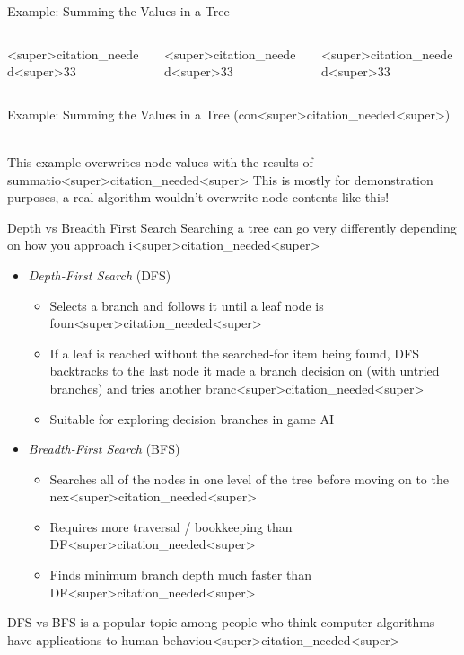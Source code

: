 \documentclass[11pt]{beamer}
\begin{document}
\begin{frame}{Example: Summing the Values in a Tree}
\begin{columns}
\begin{column}{<super>citation_needed<super>33\textwidth}
\center
\
\
\end{column}
\begin{column}{<super>citation_needed<super>33\textwidth}
\center
\
\
\end{column}
\begin{column}{<super>citation_needed<super>33\textwidth}
\center
\
\
\end{column}
\end{columns}
\end{frame}

\begin{frame}{Example: Summing the Values in a Tree (con<super>citation_needed<super>)}
\center
\
\
\
\

This example overwrites node values with the results of summatio<super>citation_needed<super>  This is mostly for demonstration purposes, a real algorithm wouldn't overwrite node contents like this! 
\end{frame}

\begin{frame}{Depth vs Breadth First Search}
Searching a tree can go very differently depending on how you approach i<super>citation_needed<super>
\begin{itemize}
\item \textit{Depth-First Search} (DFS)
\begin{itemize}
\item Selects a branch and follows it until a leaf node is foun<super>citation_needed<super>
\item If a leaf is reached without the searched-for item being found, DFS backtracks to the last node it made a branch decision on (with untried branches) and tries another branc<super>citation_needed<super>
\item Suitable for exploring decision branches in game AI
\end{itemize}
\item \textit{Breadth-First Search} (BFS)
\begin{itemize}
\item Searches all of the nodes in one level of the tree before moving on to the nex<super>citation_needed<super>  
\item Requires more traversal / bookkeeping than DF<super>citation_needed<super>
\item Finds minimum branch depth much faster than DF<super>citation_needed<super>  
\end{itemize}
\end{itemize}
DFS vs BFS is a popular topic among people who think computer algorithms have applications to human behaviou<super>citation_needed<super>  
\end{frame}
\end{document}
